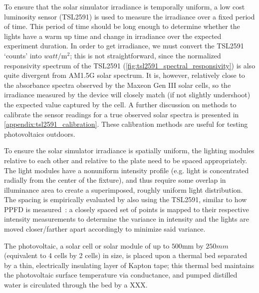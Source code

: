 To ensure that the solar simulator irradiance is temporally uniform, a low
cost luminosity sensor (TSL2591) is used to measure the irradiance over a fixed
period of time. This period of time should be long enough to determine whether
the lights have a warm up time and change in irradiance over the expected
experiment duration. In order to get irradiance, we must convert the TSL2591
`counts' into $\si{watt}/\si{\meter}^2$; this is not straightforward, since
the normalized responsivity spectrum of the TSL2591
(\autoref{fig:tsl2591_spectral_responsivity}) is also quite divergent from
AM1.5G solar spectrum. It is, however, relatively close to the absorbance
spectra observed by the Maxeon Gen III solar cells, so the irradiance measured
by the device will closely match (if not slightly undershoot) the expected value
captured by the cell. A further discussion on methods to calibrate the sensor
readings for a true observed solar spectra is presented in
\autoref{appendix:tsl2591_calibration}. These calibration methods are useful for
testing photovoltaics outdoors.

To ensure the solar simulator irradiance is spatially uniform, the lighting
modules relative to each other and relative to the plate need to be spaced
appropriately. The light modules have a nonuniform intensity profile (e.g. light
is concentrated radially from the center of the fixture), and thus require some
overlap in illuminance area to create a superimposed, roughly uniform light
distribution. The spacing is empirically evaluated by also using the TSL2591,
similar to how \acf{PPFD} is measured~\cite{ppfd_measurement}: a closely spaced
set of points is mapped to their respective intensity measurements to
determine the variance in intensity and the lights are moved closer/farther
apart accordingly to minimize said variance.

The photovoltaic, a solar cell or solar module of up to $500 \si{\mm}$ by $250
\si{mm}$ (equivalent to 4 cells by 2 cells) in size, is placed upon a thermal
bed separated by a thin, electrically insulating layer of Kapton tape; this
thermal bed maintains the photovoltaic surface temperature via conductance, and
pumped distilled water is circulated through the bed by a  XXX.

